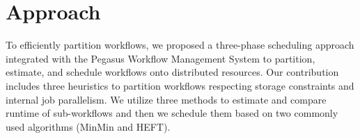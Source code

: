 

\section{Approach}

To efficiently partition workflows, we proposed a three-phase scheduling approach integrated with the Pegasus Workflow Management System to partition, estimate, and schedule workflows onto distributed resources. Our contribution includes three heuristics to partition workflows respecting storage constraints and internal job parallelism. We utilize three methods to estimate and compare runtime of sub-workflows and then we schedule them based on two commonly used algorithms (MinMin and HEFT).  

